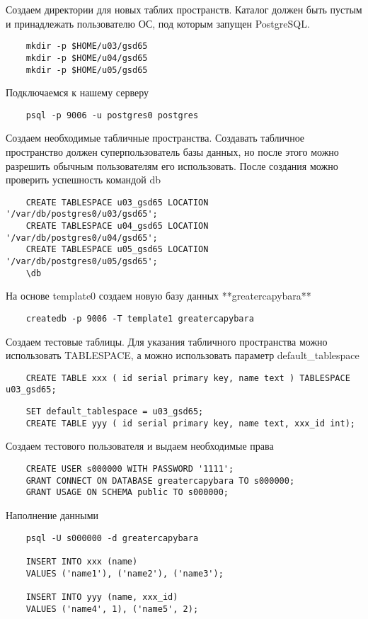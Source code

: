 \documentclass{article}
\begin{document}
Создаем директории для новых таблих пространств. Каталог должен быть пустым и принадлежать пользователю ОС, под которым запущен PostgreSQL.
\begin{verbatim}
    mkdir -p $HOME/u03/gsd65
    mkdir -p $HOME/u04/gsd65
    mkdir -p $HOME/u05/gsd65
\end{verbatim}
Подключаемся к нашему серверу
\begin{verbatim}
    psql -p 9006 -u postgres0 postgres
\end{verbatim}
Создаем необходимые табличные пространства. 
Создавать табличное пространство должен суперпользователь базы данных, но после этого можно разрешить обычным пользователям его использовать. После создания можно проверить успешность командой db
\begin{verbatim}
    CREATE TABLESPACE u03_gsd65 LOCATION '/var/db/postgres0/u03/gsd65';
    CREATE TABLESPACE u04_gsd65 LOCATION '/var/db/postgres0/u04/gsd65';
    CREATE TABLESPACE u05_gsd65 LOCATION '/var/db/postgres0/u05/gsd65';
    \db
\end{verbatim}
На основе template0 создаем новую базу данных **greatercapybara**
\begin{verbatim}
    createdb -p 9006 -T template1 greatercapybara
\end{verbatim}
Создаем тестовые таблицы. Для указания табличного пространства можно использовать TABLESPACE, а можно использовать параметр default\_tablespace 
\begin{verbatim}
    CREATE TABLE xxx ( id serial primary key, name text ) TABLESPACE u03_gsd65;
\end{verbatim}
\begin{verbatim}
    SET default_tablespace = u03_gsd65;
    CREATE TABLE yyy ( id serial primary key, name text, xxx_id int);
\end{verbatim}
Создаем тестового пользователя и выдаем необходимые права
\begin{verbatim}
    CREATE USER s000000 WITH PASSWORD '1111';
    GRANT CONNECT ON DATABASE greatercapybara TO s000000;
    GRANT USAGE ON SCHEMA public TO s000000;
\end{verbatim}
Наполнение данными
\begin{verbatim}
    psql -U s000000 -d greatercapybara
    
    INSERT INTO xxx (name)
    VALUES ('name1'), ('name2'), ('name3');
    
    INSERT INTO yyy (name, xxx_id)
    VALUES ('name4', 1), ('name5', 2);
\end{verbatim}
\end{document}
